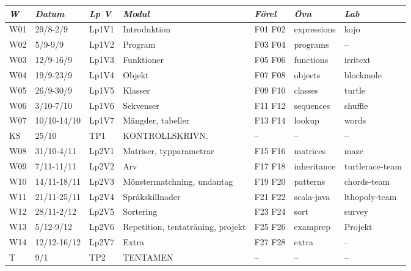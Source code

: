 \begin{tabular}{l|l|l|l|l|l|l}
\textit{W} & \textit{Datum} & \textit{Lp V} & \textit{Modul} & \textit{Förel} & \textit{Övn} & \textit{Lab} \\ \hline \hline
W01 & 29/8-2/9 & Lp1V1 & Introduktion & F01 F02 & expressions & kojo \\
W02 & 5/9-9/9 & Lp1V2 & Program & F03 F04 & programs & -- \\
W03 & 12/9-16/9 & Lp1V3 & Funktioner & F05 F06 & functions & irritext \\
W04 & 19/9-23/9 & Lp1V4 & Objekt & F07 F08 & objects & blockmole \\
W05 & 26/9-30/9 & Lp1V5 & Klasser & F09 F10 & classes & turtle \\
W06 & 3/10-7/10 & Lp1V6 & Sekvenser & F11 F12 & sequences & shuffle \\
W07 & 10/10-14/10 & Lp1V7 & Mängder, tabeller & F13 F14 & lookup & words \\
KS & 25/10 & TP1 & KONTROLLSKRIVN. & -- & -- & -- \\
W08 & 31/10-4/11 & Lp2V1 & Matriser, typparametrar & F15 F16 & matrices & maze \\
W09 & 7/11-11/11 & Lp2V2 & Arv & F17 F18 & inheritance & turtlerace-team \\
W10 & 14/11-18/11 & Lp2V3 & Mönstermatchning, undantag & F19 F20 & patterns & chords-team \\
W11 & 21/11-25/11 & Lp2V4 & Språkskillnader & F21 F22 & scala-java & lthopoly-team \\
W12 & 28/11-2/12 & Lp2V5 & Sortering & F23 F24 & sort & survey \\
W13 & 5/12-9/12 & Lp2V6 & Repetition, tentaträning, projekt & F25 F26 & examprep & Projekt \\
W14 & 12/12-16/12 & Lp2V7 & Extra & F27 F28 & extra & -- \\
T & 9/1 & TP2 & TENTAMEN & -- & -- & -- \\
\end{tabular}
